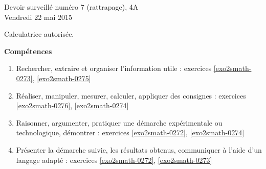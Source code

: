 \documentclass[a4paper,10pt]{article}
\begin{document}
\begin{feuilleDS}{Devoir surveillé numéro 7 (rattrapage), 4A\\ \small Vendredi 22 mai 2015}
    \begin{center}
        \small Calculatrice autorisée.
    \end{center}



\vspace{1cm}
{\bf Compétences}
\small
\begin{enumerate}
    \item
        Rechercher, extraire et organiser l'information utile : exercices \ref{exo2smath-0273}, \ref{exo2smath-0275}
    \item
        Réaliser, manipuler, mesurer, calculer, appliquer des consignes : exercices \ref{exo2smath-0276}, \ref{exo2smath-0274}
    \item
        Raisonner, argumenter, pratiquer une démarche expérimentale ou technologique, démontrer : exercices \ref{exo2smath-0272}, \ref{exo2smath-0274}
    \item 
        Présenter la démarche suivie, les résultats obtenus, communiquer à l'aide d’un langage adapté : exercices \ref{exo2smath-0272}, \ref{exo2smath-0273}
\end{enumerate}
\end{feuilleDS}
\end{document}
